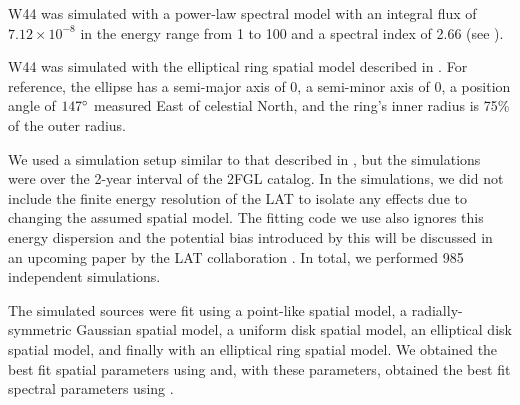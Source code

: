 W44 was simulated with a power-law spectral model with an integral flux
of $7.12\times10^{-8}$ \fluxunits in the energy range from 1 \gev to
100 \gev and a spectral index of 2.66 (see ).

W44 was simulated with the elliptical ring spatial model described in
\cite{abdo_2010a_gamma-ray-emission}. For reference, the ellipse has
a semi-major axis of 0, a semi-minor axis of 0, a position
angle of $147^\circ$ measured East of celestial North, and the ring's
inner radius is 75\% of the outer radius.

We used a simulation setup similar to that described in
, but the simulations were over the
2-year interval of the 2FGL catalog.  In the simulations, we did not
include the finite energy resolution of the LAT to isolate any effects
due to changing the assumed spatial model.  The fitting code we use also
ignores this energy dispersion and the potential bias introduced by
this will be discussed in an upcoming paper by the LAT collaboration
\citep{ackermann_2012a_fermi-large}.  In total, we performed 985
independent simulations.

The simulated sources were fit using a point-like spatial model,
a radially-symmetric Gaussian spatial model, a uniform disk spatial
model, an elliptical disk spatial model, and finally with an elliptical
ring spatial model.  We obtained the best fit spatial parameters using
\pointlike and, with these parameters, obtained the best fit spectral
parameters using \gtlike.

